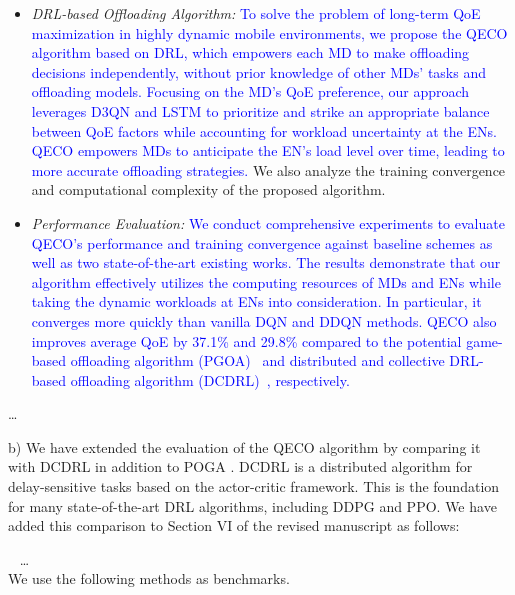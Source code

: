 \documentclass[12pt,draftclsnofoot,onecolumn]{IEEEtran}
\newcommand{\rev}[1]{{\color{blue}#1}} %
\newcommand{\rev}[1]{#1}
\newenvironment{my}[2]%
{\begin{list}{}%
{\setlength{\rightmargin}{#1}\setlength{\leftmargin}{#2}}%


 \item[]{}

} {\end{list}}
\begin{document}
\begin{enumerate}
\begin{my}{1cm}{1cm}
{\begin{itemize}
			\item \textit{DRL-based Offloading Algorithm:} \textcolor{blue}{To solve the problem of long-term QoE maximization in highly dynamic mobile environments, we propose the QECO algorithm based on DRL, which empowers each MD to make offloading decisions independently, without prior knowledge of other MDs' tasks and offloading models. Focusing on the MD's QoE preference, our approach leverages D3QN and LSTM to prioritize and strike an appropriate balance between QoE factors while accounting for workload uncertainty at the ENs. QECO empowers MDs to anticipate the EN's load level over time, leading to more accurate offloading strategies.} We also analyze the training convergence and computational complexity of the proposed algorithm.
			
			\item \textit{Performance Evaluation:} \textcolor{blue}{We conduct comprehensive experiments to evaluate QECO’s performance and training convergence against baseline schemes as well as two state-of-the-art existing works. The results demonstrate that our algorithm effectively utilizes the computing resources of MDs and ENs while taking the dynamic workloads at ENs into consideration. In particular, it converges more quickly than vanilla DQN and DDQN methods. QECO also improves average QoE by 37.1\% and 29.8\% compared to the potential game-based offloading algorithm (PGOA)~\cite{yang2018distributed} and distributed and collective DRL-based offloading algorithm (DCDRL)~\cite{qiu2020distributed}, respectively.}
			
		\end{itemize}
		
		\dots
		
	}
	
\end{my}\vspace{6mm}


b) We have extended the evaluation of the QECO algorithm by comparing it with DCDRL \cite{qiu2020distributed} in addition to POGA \cite{yang2018distributed}. DCDRL is a distributed algorithm for delay-sensitive tasks based on the actor-critic framework. This is the foundation for many state-of-the-art DRL algorithms, including DDPG and PPO. We have added this comparison to Section VI of the revised manuscript as follows: 
\begin{my}{1cm}{1cm}
	\rev{
		{\
			\color{black}
			\hspace{-10mm}  \dots \\ We use the following methods as benchmarks.
			\begin{itemize}
				

\end{itemize}}}
\end{my}
\end{enumerate}
\end{document}
